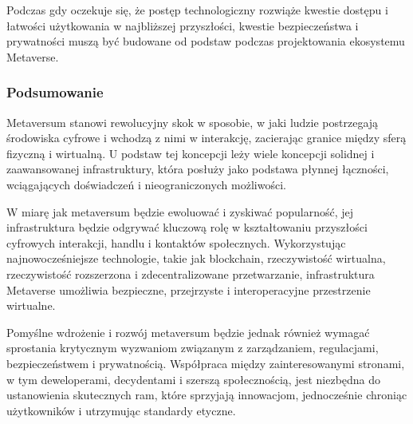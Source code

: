 Podczas gdy oczekuje się, że postęp technologiczny rozwiąże kwestie dostępu i łatwości użytkowania w najbliższej przyszłości, kwestie bezpieczeństwa i prywatności muszą być budowane od podstaw podczas projektowania ekosystemu Metaverse\cite{metaverseSecurityIssuesChallengesAndViableZTAModel}. 


\subsubsection{Podsumowanie}

Metaversum stanowi rewolucyjny skok w sposobie, w jaki ludzie postrzegają środowiska cyfrowe i wchodzą z nimi w interakcję, zacierając granice między sferą fizyczną i wirtualną. U podstaw tej koncepcji leży wiele koncepcji solidnej i zaawansowanej infrastruktury, która posłuży jako podstawa płynnej łączności, wciągających doświadczeń i nieograniczonych możliwości. 

W miarę jak metaversum będzie ewoluować i zyskiwać popularność, jej infrastruktura będzie odgrywać kluczową rolę w kształtowaniu przyszłości cyfrowych interakcji, handlu i kontaktów społecznych. Wykorzystując najnowocześniejsze technologie, takie jak blockchain, rzeczywistość wirtualna, rzeczywistość rozszerzona i zdecentralizowane przetwarzanie, infrastruktura Metaverse umożliwia bezpieczne, przejrzyste i interoperacyjne przestrzenie wirtualne.

Pomyślne wdrożenie i rozwój metaversum będzie jednak również wymagać sprostania krytycznym wyzwaniom związanym z zarządzaniem, regulacjami, bezpieczeństwem i prywatnością. Współpraca między zainteresowanymi stronami, w tym deweloperami, decydentami i szerszą społecznością, jest niezbędna do ustanowienia skutecznych ram, które sprzyjają innowacjom, jednocześnie chroniąc użytkowników i utrzymując standardy etyczne.